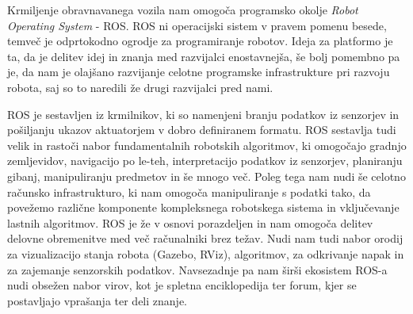 \documentclass[10pt,a4paper]{article}
\begin{document}

Krmiljenje obravnavanega vozila nam omogoča programsko okolje \textit{Robot Operating System} - ROS. ROS ni operacijski sistem v pravem pomenu besede, temveč je odprtokodno ogrodje za programiranje robotov. Ideja za platformo je ta, da je delitev idej in znanja med razvijalci enostavnejša, še bolj pomembno pa je, da nam je olajšano razvijanje celotne programske infrastrukture pri razvoju robota, saj so to naredili že drugi razvijalci pred nami.

ROS je sestavljen iz krmilnikov, ki so namenjeni branju podatkov iz senzorjev in pošiljanju ukazov aktuatorjem v dobro definiranem formatu. ROS sestavlja tudi velik in rastoči nabor fundamentalnih robotskih algoritmov, ki omogočajo gradnjo zemljevidov, navigacijo po le-teh, interpretacijo podatkov iz senzorjev, planiranju gibanj, manipuliranju predmetov in še mnogo več. Poleg tega nam nudi še celotno računsko infrastrukturo, ki nam omogoča manipuliranje s podatki tako, da povežemo različne komponente kompleksnega robotskega sistema in vključevanje lastnih algoritmov. ROS je že v osnovi porazdeljen in nam omogoča delitev delovne obremenitve med več računalniki brez težav. Nudi nam tudi nabor orodij za vizualizacijo stanja robota (Gazebo, RViz), algoritmov, za odkrivanje napak in za zajemanje senzorskih podatkov. Navsezadnje pa nam širši ekosistem ROS-a nudi obsežen nabor virov, kot je spletna enciklopedija ter forum, kjer se postavljajo vprašanja ter deli znanje.
\end{document}
